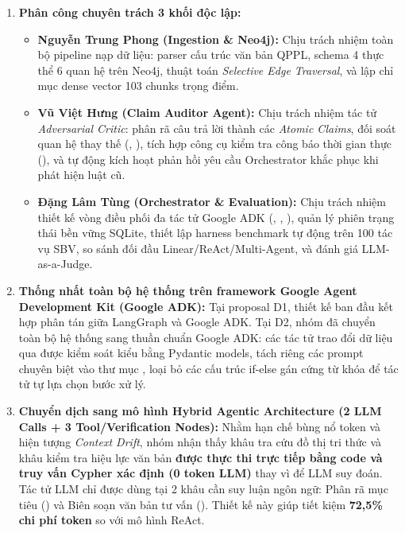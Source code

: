 \documentclass[10pt,a4paper]{article}
\begin{document}
\begin{enumerate}
  \item \textbf{Phân công chuyên trách 3 khối độc lập:}
    \begin{itemize}
      \item \textbf{Nguyễn Trung Phong (Ingestion \& Neo4j):} Chịu trách nhiệm toàn bộ pipeline nạp dữ liệu: parser cấu trúc văn bản QPPL, schema 4 thực thể 6 quan hệ trên Neo4j, thuật toán \emph{Selective Edge Traversal}, và lập chỉ mục dense vector 103 chunks trọng điểm.
      \item \textbf{Vũ Việt Hưng (Claim Auditor Agent):} Chịu trách nhiệm tác tử \emph{Adversarial Critic}: phân rã câu trả lời thành các \emph{Atomic Claims}, đối soát quan hệ thay thế (, ), tích hợp công cụ kiểm tra công báo thời gian thực (), và tự động kích hoạt phản hồi yêu cầu Orchestrator khắc phục khi phát hiện luật cũ.
      \item \textbf{Đặng Lâm Tùng (Orchestrator \& Evaluation):} Chịu trách nhiệm thiết kế vòng điều phối đa tác tử Google ADK (, , ), quản lý phiên trạng thái bền vững SQLite, thiết lập harness benchmark tự động trên 100 tác vụ SBV, so sánh đối đầu Linear/ReAct/Multi-Agent, và đánh giá LLM-as-a-Judge.
    \end{itemize}

  \item \textbf{Thống nhất toàn bộ hệ thống trên framework Google Agent Development Kit (Google ADK):}
    Tại proposal D1, thiết kế ban đầu kết hợp phân tán giữa LangGraph và Google ADK. Tại D2, nhóm đã chuyển toàn bộ hệ thống sang thuần chuẩn Google ADK: các tác tử trao đổi dữ liệu qua  được kiểm soát kiểu bằng Pydantic models, tách riêng các prompt chuyên biệt vào thư mục , loại bỏ các cấu trúc if-else gán cứng từ khóa để tác tử tự lựa chọn bước xử lý.

  \item \textbf{Chuyển dịch sang mô hình Hybrid Agentic Architecture (2 LLM Calls + 3 Tool/Verification Nodes):}
    Nhằm hạn chế bùng nổ token và hiện tượng \emph{Context Drift}, nhóm nhận thấy khâu tra cứu đồ thị tri thức và khâu kiểm tra hiệu lực văn bản \textbf{được thực thi trực tiếp bằng code và truy vấn Cypher xác định (0 token LLM)} thay vì để LLM suy đoán. Tác tử LLM chỉ được dùng tại 2 khâu cần suy luận ngôn ngữ: Phân rã mục tiêu () và Biên soạn văn bản tư vấn (). Thiết kế này giúp tiết kiệm \textbf{72,5\% chi phí token} so với mô hình ReAct.
\end{enumerate}
\end{document}
